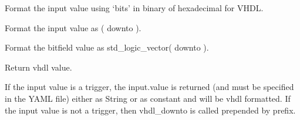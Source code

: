 \documentclass[letterpaper,10pt,english]{sphinxmanual}
\begin{document}

\begin{fulllineitems}
\label{\detokenize{developer:wuppercodegen.filter.vhdl_constant}}
Format the input value using `bits' in binary of hexadecimal for VHDL.

\end{fulllineitems}


\begin{fulllineitems}
\label{\detokenize{developer:wuppercodegen.filter.vhdl_downto}}
Format the input value as ( downto ).

\end{fulllineitems}


\begin{fulllineitems}
\label{\detokenize{developer:wuppercodegen.filter.vhdl_logic_vector}}
Format the bitfield value as std\_logic\_vector( downto ).

\end{fulllineitems}


\begin{fulllineitems}
\label{\detokenize{developer:wuppercodegen.filter.vhdl_value}}
Return vhdl value.

If the input value is a trigger, the input.value is returned (and must be
specified in the YAML file) either as String or as constant and will be vhdl
formatted.
If the input value is not a trigger, then vhdl\_downto is called
prepended by prefix.

\end{fulllineitems}

\end{document}
